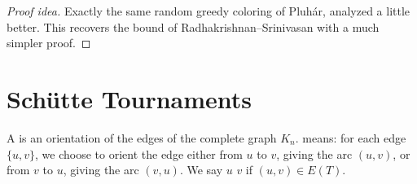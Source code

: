 \begin{proof}[Proof idea]
    Exactly the same random greedy coloring of Pluh\'ar, analyzed a little better. This recovers the bound of Radhakrishnan--Srinivasan with a much simpler proof.
\end{proof}

\section{Sch\"utte Tournaments}\label{sec:schutte}

\begin{definition}[Tournament]
    A  is an orientation of the edges of the complete graph \(K_n\).  means: for each edge \(\{u, v\}\), we choose to orient the edge either from \(u\) to \(v\), giving the arc \((u, v)\), or from \(v\) to \(u\), giving the arc \((v, u)\). We say \(u\)  \(v\) if \((u, v) \in E(T)\).
\end{definition}

